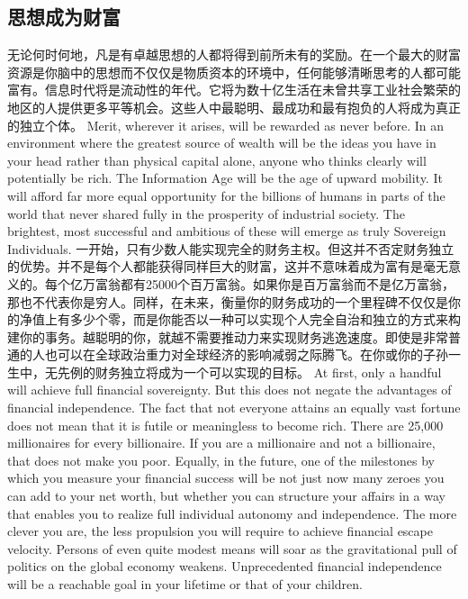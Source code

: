 \subsection{思想成为财富}
\begin{paracol}{2}[]
无论何时何地，凡是有卓越思想的人都将得到前所未有的奖励。在一个最大的财富资源是你脑中的思想而不仅仅是物质资本的环境中，任何能够清晰思考的人都可能富有。信息时代将是流动性的年代。它将为数十亿生活在未曾共享工业社会繁荣的地区的人提供更多平等机会。这些人中最聪明、最成功和最有抱负的人将成为真正的独立个体。
\switchcolumn
Merit, wherever it arises, will be rewarded as never before. In an environment where the greatest source of wealth will be the ideas you have in your head rather than physical capital alone, anyone who thinks clearly will potentially be rich. The Information Age will be the age of upward mobility. It will afford far more equal opportunity for the billions of humans in parts of the world that never shared fully in the prosperity of industrial society. The brightest, most successful and ambitious of these will emerge as truly Sovereign Individuals. 
\switchcolumn*
一开始，只有少数人能实现完全的财务主权。但这并不否定财务独立的优势。并不是每个人都能获得同样巨大的财富，这并不意味着成为富有是毫无意义的。每个亿万富翁都有25000个百万富翁。如果你是百万富翁而不是亿万富翁，那也不代表你是穷人。同样，在未来，衡量你的财务成功的一个里程碑不仅仅是你的净值上有多少个零，而是你能否以一种可以实现个人完全自治和独立的方式来构建你的事务。越聪明的你，就越不需要推动力来实现财务逃逸速度。即使是非常普通的人也可以在全球政治重力对全球经济的影响减弱之际腾飞。在你或你的子孙一生中，无先例的财务独立将成为一个可以实现的目标。
\switchcolumn
At first, only a handful will achieve full financial sovereignty. But this does not negate the advantages of financial independence. The fact that not everyone attains an equally vast fortune does not mean that it is futile or meaningless to become rich. There are 25,000 millionaires for every billionaire. If you are a millionaire and not a billionaire, that does not make you poor. Equally, in the future, one of the milestones by which you measure your financial success will be not just now many zeroes you can add to your net worth, but whether you can structure your affairs in a way that enables you to realize full individual autonomy and independence. The more clever you are, the less propulsion you will require to achieve financial escape velocity. Persons of even quite modest means will soar as the gravitational pull of politics on the global economy weakens. Unprecedented financial independence will be a reachable goal in your lifetime or that of your children.

\end{paracol}
